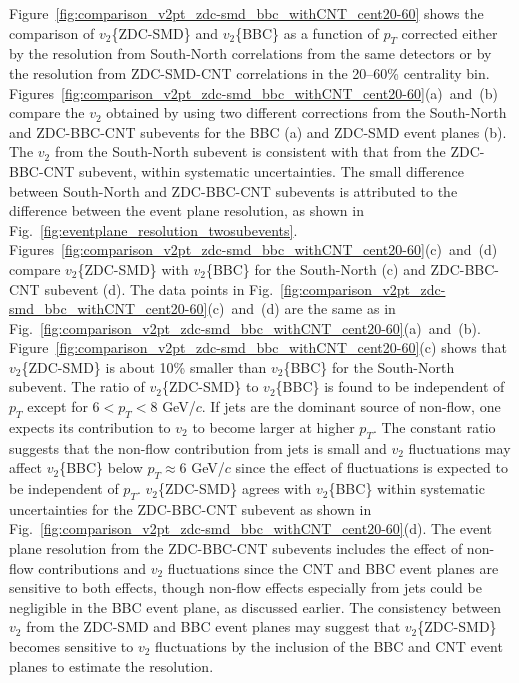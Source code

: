 \documentclass[aps,prc,superscriptaddress,showpacs,floatfix,twocolumn]{revtex4}
\newcommand \gevc{GeV/$c$\xspace}
\newcommand \pt{\mbox{$p_T$}\xspace}
\newcommand \Fig{Fig.\xspace}
\begin{document}
Figure~\ref{fig:comparison_v2pt_zdc-smd_bbc_withCNT_cent20-60} 
shows the comparison of $v_2$\{ZDC-SMD\} and $v_2$\{BBC\} as a 
function of \pt corrected either by the resolution from 
South-North correlations from the same detectors or by the 
resolution from ZDC-SMD-CNT correlations in the 20--60\% 
centrality bin. 
Figures~\ref{fig:comparison_v2pt_zdc-smd_bbc_withCNT_cent20-60}(a)~and~(b) 
compare the $v_2$ obtained by using two different 
corrections from the South-North and ZDC-BBC-CNT subevents for 
the BBC (a) and ZDC-SMD event planes (b). The $v_2$ from the 
South-North subevent is consistent with that from the 
ZDC-BBC-CNT subevent, within systematic uncertainties. The small 
difference between South-North and ZDC-BBC-CNT subevents is 
attributed to the difference between the event plane resolution, 
as shown in \Fig~\ref{fig:eventplane_resolution_twosubevents}.  
Figures~\ref{fig:comparison_v2pt_zdc-smd_bbc_withCNT_cent20-60}(c)~and~(d)
compare $v_2$\{ZDC-SMD\} with $v_2$\{BBC\} for the 
South-North (c) and ZDC-BBC-CNT subevent (d). The data 
points in 
Fig.~\ref{fig:comparison_v2pt_zdc-smd_bbc_withCNT_cent20-60}(c)~and~(d) 
are the same as in 
Fig.~\ref{fig:comparison_v2pt_zdc-smd_bbc_withCNT_cent20-60}(a)~and~(b).
Figure~\ref{fig:comparison_v2pt_zdc-smd_bbc_withCNT_cent20-60}(c) 
shows that $v_2$\{ZDC-SMD\} is about 10\% smaller than 
$v_2$\{BBC\} for the South-North subevent. The ratio of 
$v_2$\{ZDC-SMD\} to $v_2$\{BBC\} is found to be independent of 
\pt except for $6 < \pt < 8$ \gevc.  If jets are the dominant 
source of non-flow, one expects its contribution to $v_2$ to 
become larger at higher \pt.  The constant ratio suggests that 
the non-flow contribution from jets is small and $v_2$ 
fluctuations may affect $v_2$\{BBC\} below \pt $ \approx 6$ 
\gevc since the effect of fluctuations is expected to be 
independent of \pt. $v_2$\{ZDC-SMD\} agrees with $v_2$\{BBC\} 
within systematic uncertainties for the ZDC-BBC-CNT subevent as 
shown in 
Fig.~\ref{fig:comparison_v2pt_zdc-smd_bbc_withCNT_cent20-60}(d). 
The event plane resolution from the ZDC-BBC-CNT subevents 
includes the effect of non-flow contributions and $v_2$ 
fluctuations since the CNT and BBC event planes are sensitive to 
both effects, though non-flow effects especially from jets could 
be negligible in the BBC event plane, as discussed earlier. The 
consistency between $v_2$ from the ZDC-SMD and BBC event planes 
may suggest that $v_2$\{ZDC-SMD\} becomes sensitive to $v_2$ 
fluctuations by the inclusion of the BBC and CNT event planes to 
estimate the resolution.
\end{document}
